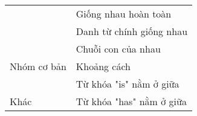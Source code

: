\begin{tabular}{|l|l|}
                                                                                                                      & Giống nhau hoàn toàn                                             \\ \cline{2-2} 
                                                                                                                      & Danh từ chính giống nhau                                         \\ \cline{2-2} 
                                                                                                                      & Chuỗi con của nhau                                               \\ \cline{2-2} 
\multirow{-11}{*}{Nhóm cơ bản}                                                                                        & Khoảng cách                                                      \\ \hline
                                                                                                                      & Từ khóa "is" nằm ở giữa                                          \\ \cline{2-2} 
\multirow{-2}{*}{Khác}                                                                                                & Từ khóa "has" nằm ở giữa                                         \\ \hline
\end{tabular}